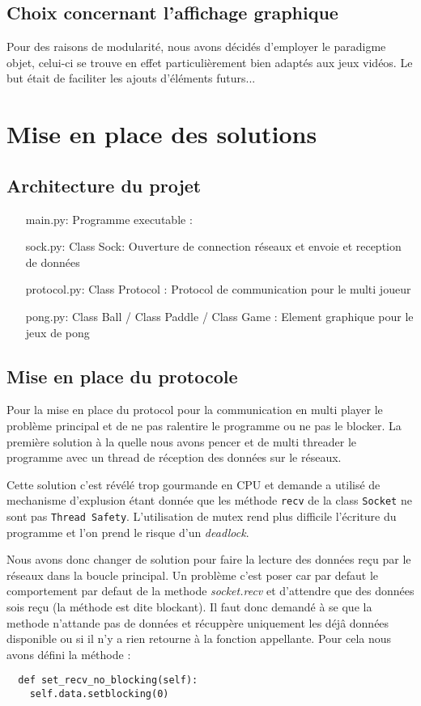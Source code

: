 \documentclass[12pt]{report}
\begin{document}
\chapter{Choix concernant l'affichage graphique} %
Pour des raisons de modularité, nous avons décidés d'employer le
paradigme objet, celui-ci se trouve en effet particulièrement bien
adaptés aux jeux vidéos. Le but était de faciliter les ajouts
d'éléments futurs...

\part{Mise en place des solutions}
\chapter{Architecture du projet}
\begin{itemize}
\item[main.py: ] Programme executable : 
\item[sock.py: ] Class Sock: Ouverture de connection réseaux et envoie
  et reception de données 
\item[protocol.py: ] Class Protocol : Protocol de communication pour le
  multi joueur
\item[pong.py: ] Class Ball / Class Paddle / Class Game : Element graphique
  pour le jeux de pong 
\end{itemize}

\chapter{Mise en place du protocole}
Pour la mise en place du protocol pour la communication en multi player le
problème principal et de ne pas ralentire le programme ou ne pas le blocker.
La première solution à la quelle nous avons pencer et de multi threader le
programme avec un thread de réception des données sur le réseaux.

Cette solution c'est révélé trop gourmande en CPU et demande a utilisé de
mechanisme d'explusion étant donnée que les méthode \texttt{recv} de la class
\texttt{Socket} ne sont pas \texttt{Thread Safety}.
L'utilisation de mutex rend plus difficile l'écriture du programme et l'on
prend le risque d'un \textit{deadlock}.

Nous avons donc changer de solution pour faire la lecture des données reçu
par le réseaux dans la boucle principal.
Un problème c'est poser car par defaut le comportement par defaut de la
methode \textit{socket.recv} et d'attendre que des données sois reçu (la
méthode est dite blockant). Il faut donc demandé à se que la methode
n'attande pas de données et récuppère uniquement les déjâ données
disponible ou si il n'y a rien retourne à la fonction appellante.
Pour cela nous avons défini la méthode :
\begin{verbatim}
  def set_recv_no_blocking(self):
    self.data.setblocking(0)
\end{verbatim}
\end{document}

